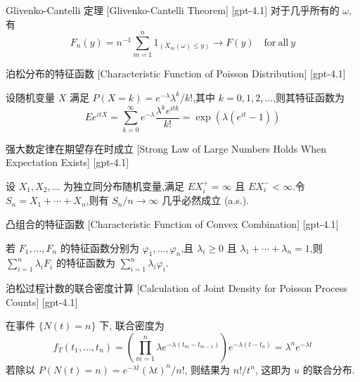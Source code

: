 \documentclass[UTF8]{ctexart}
\begin{document}
    \begin{thm}
        {Glivenko-Cantelli 定理}
        [Glivenko-Cantelli Theorem]
        [gpt-4.1]
        对于几乎所有的 $\omega$,有
\[
F_{n}(y) = n^{-1} \sum_{m=1}^{n} 1_{(X_{m}(\omega) \leq y)} \to F(y) \quad \mathrm{for\ all\ } y
\]

    \end{thm}
    
    
    
    \begin{xmp}
        {泊松分布的特征函数}
        [Characteristic Function of Poisson Distribution]
        [gpt-4.1]
        
设随机变量 $X$ 满足 $P(X = k) = e^{-\lambda} \lambda^{k} / k!$,其中 $k = 0, 1, 2, \ldots$,则其特征函数为
\[
E e^{i t X} = \sum_{k=0}^{\infty} e^{-\lambda} \frac{\lambda^{k} e^{i t k}}{k!} = \exp(\lambda (e^{i t} - 1))
\]

    \end{xmp}
    
    
    
    \begin{thm}
        {强大数定律在期望存在时成立}
        [Strong Law of Large Numbers Holds When Expectation Exists]
        [gpt-4.1]
        
设 $X_{1}, X_{2}, \ldots$ 为独立同分布随机变量,满足 $E X_{i}^{+} = \infty$ 且 $E X_{i}^{-} < \infty$.令 $S_{n} = X_{1} + \cdots + X_{n}$,则有 $S_{n} / n \to \infty$ 几乎必然成立 (a.s.).

    \end{thm}
    
    
    
    \begin{lma}
        {凸组合的特征函数}
        [Characteristic Function of Convex Combination]
        [gpt-4.1]
        
若 $F_1, \ldots, F_n$ 的特征函数分别为 $\varphi_1, \ldots, \varphi_n$,且 $\lambda_i \geq 0$ 且 $\lambda_1 + \cdots + \lambda_n = 1$,则 $\sum_{i=1}^n \lambda_i F_i$ 的特征函数为 $\sum_{i=1}^n \lambda_i \varphi_i$.

    \end{lma}
    
    
    
    \begin{prf}
        {泊松过程计数的联合密度计算}
        [Calculation of Joint Density for Poisson Process Counts]
        [gpt-4.1]
        
在事件 $\{N(t) = n\}$ 下, 联合密度为
\[
f_T(t_1, \dots, t_n) = \left(\prod_{m=1}^n \lambda e^{-\lambda (t_m - t_{m-1})}\right) e^{-\lambda (t - t_n)} = \lambda^n e^{-\lambda t}
\]
若除以 $P(N(t) = n) = e^{-\lambda t} (\lambda t)^n / n!$, 则结果为 $n! / t^n$, 这即为 $
u$ 的联合分布.

    \end{prf}
    
\end{document}
